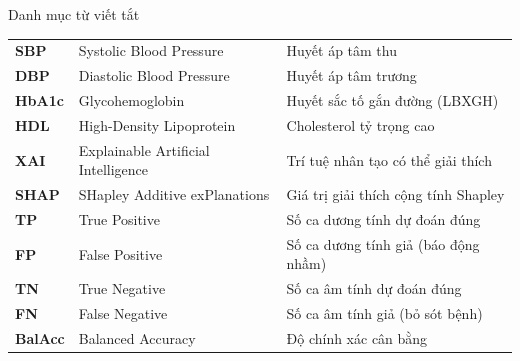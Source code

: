 \documentclass{uetgraduation}
\begin{document}
\begin{contentlisting}
\begin{contentlistingsection}{Danh mục từ viết tắt}
\begin{longtable}{p{2.0cm} p{6.4cm} p{6.4cm}}
\textbf{SBP}    & Systolic Blood Pressure & Huyết áp tâm thu \\
\textbf{DBP}    & Diastolic Blood Pressure & Huyết áp tâm trương \\
\textbf{HbA1c}  & Glycohemoglobin & Huyết sắc tố gắn đường (LBXGH) \\
\textbf{HDL}    & High-Density Lipoprotein & Cholesterol tỷ trọng cao \\
\textbf{XAI}    & Explainable Artificial Intelligence & Trí tuệ nhân tạo có thể giải thích \\
\textbf{SHAP}   & SHapley Additive exPlanations & Giá trị giải thích cộng tính Shapley \\
\textbf{TP}     & True Positive & Số ca dương tính dự đoán đúng \\
\textbf{FP}     & False Positive & Số ca dương tính giả (báo động nhầm) \\
\textbf{TN}     & True Negative & Số ca âm tính dự đoán đúng \\
\textbf{FN}     & False Negative & Số ca âm tính giả (bỏ sót bệnh) \\
\textbf{BalAcc} & Balanced Accuracy & Độ chính xác cân bằng \\
\end{longtable}
\end{contentlistingsection}
\end{contentlisting}







\appendix

\end{document}
